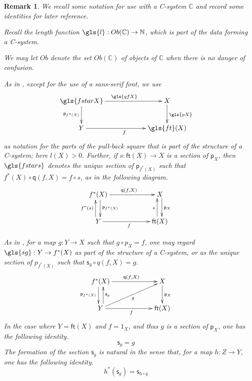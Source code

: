 \documentclass[12pt]{article}
\numberwithin{equation}{section}
\newenvironment{eq}{\begin{equation}}{\end{equation}}
\newtheorem{remark}[proposition]{Remark}
\newcommand{\sr}{\rightarrow}
\newcommand{\NN}{{\mathbb N}}
\newcommand{\CC}{{\mathbb C}}  %
\newcommand{\ft}{\mathsf{ft}}
\newcommand{\p}{\mathsf{p}}
\newcommand{\q}{\mathsf{q}}
\newcommand{\s}{\mathsf{s}}     %
\newcommand{\Ob}{Ob}
\begin{document}
\begin{remark}
  We recall some notation for use with a C-system $\CC$ and record some identities for later reference.

  Recall the length function $\gls{l} : \Ob(\CC) \to \NN$, which is part of the data forming a C-system.

  We may let $\Ob$ denote the set $\Ob(\CC)$ of objects of $\CC$ when there is no danger of confusion.

  As in \cite[Def.~2.1 and Prop.~2.4]{Csubsystems}, except for the use of a sans-serif font, we use
  \begin{eq}
    \xymatrix@C=5pc{
      \gls{fstarX} \ar[r]^{\gls{qfX}} \ar[d]_{\p_{f^*(X)}}  & X \ar[d]^{\gls{pX}} \\
      Y \ar[r]_f & \gls{ft}(X)
    }
  \end{eq}%
  as notation for the parts of the pull-back square that is part of the
  structure of a C-system; here $l(X) > 0$.
  Further, if $s : \ft(X) \sr X$ is a section of $\p_X$, then $\gls{fstars}$ denotes
  the unique section of $\p_{f^*(X)}$ such that $f^*(X) \circ \q(f,X) = f \circ
  s$, as in the following diagram.
  \begin{eq}
    \xymatrix@C=5pc{
      f^*(X) \ar[r]^{\q(f,X)} \ar@<3pt>[d]^{\p_{f^*(X)}}  & X \ar@<3pt>[d]^{\p_X} \\
      Y \ar[r]_f \ar@<4pt>[u]^{f^*(s)} & \ft(X) \ar@<4pt>[u]^s
    }
  \end{eq}%

  As in \cite[Def.~2.3 and Prop.~2.4]{Csubsystems}, for a map $g : Y \sr X$
  such that $g \circ p_X = f$, one may regard
  $\gls{sg} : Y \sr f^*(X)$ as part of the structure of a C-system, or
  as the unique section of $p_{f^*(X)}$ such that $\s_g \circ q(f,X) = g$.
  \begin{eq}
    \xymatrix@C=5pc{
      f^*(X) \ar[r]^{\q(f,X)} \ar@<-3pt>[d]_{\p_{f^*(X)}} & X \ar[d]^{\p_X} \\
      Y \ar[ru]_g \ar[r]_f \ar@<-4pt>[u]_{\s_g} & \ft(X)
    }
  \end{eq}%
  In the case where $Y = \ft(X)$ and $f = 1_X$, and thus $g$ is a section of $\p_X$,
  one has the following identity.
  \begin{eq}
    \label{section-section}
    \s_g = g
  \end{eq}%
  The formation of the section $\s_g$ is natural in the sense that, for a map
  $h : Z \to Y$, one has the following identity.
  \begin{eq}
    \label{s-naturality}
    h^* (\s_g) = \s_{h \circ g}
  \end{eq}%


\end{remark}
\end{document}
